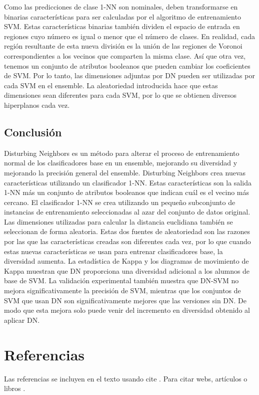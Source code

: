 Como las predicciones de clase 1-NN son nominales, deben transformarse en binarias
características para ser calculadas por el algoritmo de entrenamiento SVM. Estas características binarias también dividen el espacio de entrada en regiones cuyo número es igual o menor que el número de clases. En realidad, cada región resultante de esta nueva división es la unión de las regiones de Voronoi correspondientes a los vecinos que comparten la misma clase. Así que otra vez, tenemos un conjunto de atributos booleanos que pueden cambiar los coeficientes de SVM.
Por lo tanto, las dimensiones adjuntas por DN pueden ser utilizadas por cada SVM en el ensemble. La aleatoriedad introducida hace que estas dimensiones sean diferentes para cada SVM, por lo que se obtienen diversos hiperplanos cada vez.
\subsection{Conclusión}
Disturbing Neighbors es un método para alterar el proceso de entrenamiento normal de los clasificadores base en un ensemble, mejorando su diversidad y mejorando la precisión general del ensemble. Disturbing Neighbors crea nuevas características utilizando un clasificador 1-NN. Estas características son la salida 1-NN más un conjunto de atributos booleanos que indican cuál es el vecino más cercano. El clasificador 1-NN se crea utilizando un pequeño subconjunto de instancias de entrenamiento seleccionadas al azar del conjunto de datos original. Las dimensiones utilizadas para calcular la distancia euclidiana también se seleccionan de forma aleatoria. Estas dos fuentes de aleatoriedad son las razones por las que las características creadas son diferentes cada vez, por lo que cuando estas nuevas características se usan para entrenar clasificadores base, la diversidad aumenta.
La estadística de Kappa y los diagramas de movimiento de Kappa muestran que DN proporciona una diversidad adicional a los alumnos de base de SVM. La validación experimental también muestra que DN-SVM no mejora significativamente la precisión de SVM, mientras que los conjuntos de SVM que usan DN son significativamente mejores que las versiones sin DN. De modo que esta mejora solo puede venir del incremento en diversidad obtenido al aplicar DN.

\section{Referencias}

Las referencias se incluyen en el texto usando cite \cite{wiki:latex}. Para citar webs, artículos o libros \cite{koza92}.



